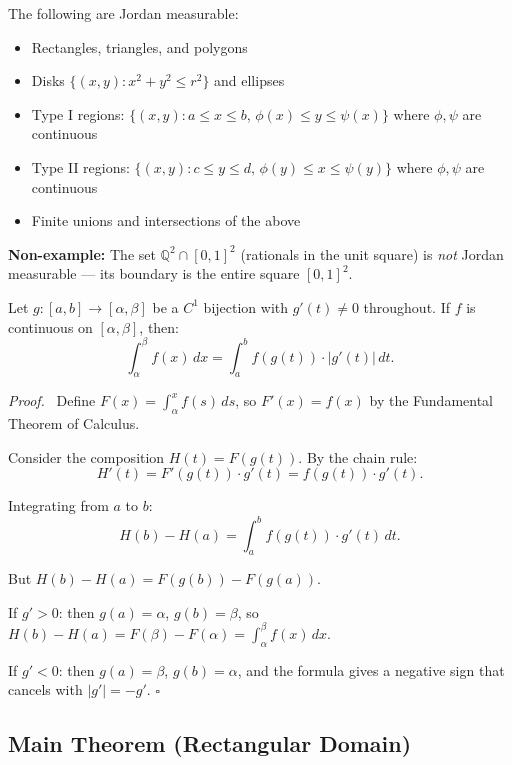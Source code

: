 \documentclass[11pt]{report}
\renewenvironment{proof}[1][Proof]{\par\noindent\textit{#1.}\ }{\hfill$\square$\par\medskip}
\begin{document}
\begin{example}
The following are Jordan measurable:
\begin{itemize}
    \item Rectangles, triangles, and polygons
    \item Disks $\{(x,y): x^2 + y^2 \leq r^2\}$ and ellipses
    \item Type I regions: $\{(x,y): a \leq x \leq b, \, \phi(x) \leq y \leq \psi(x)\}$ where $\phi, \psi$ are continuous
    \item Type II regions: $\{(x,y): c \leq y \leq d, \, \phi(y) \leq x \leq \psi(y)\}$ where $\phi, \psi$ are continuous
    \item Finite unions and intersections of the above
\end{itemize}

\textbf{Non-example:} The set $\mathbb{Q}^2 \cap [0,1]^2$ (rationals in the unit square) is \textit{not} Jordan measurable --- its boundary is the entire square $[0,1]^2$.
\end{example}

\begin{lemma}
\label{lem:1d-cov}
Let $g: [a, b] \to [\alpha, \beta]$ be a $C^1$ bijection with $g'(t) \neq 0$ throughout. If $f$ is continuous on $[\alpha, \beta]$, then:
\[
\int_\alpha^\beta f(x) \, dx = \int_a^b f(g(t)) \cdot |g'(t)| \, dt.
\]
\end{lemma}

\begin{proof}
Define $F(x) = \int_\alpha^x f(s) \, ds$, so $F'(x) = f(x)$ by the Fundamental Theorem of Calculus.

Consider the composition $H(t) = F(g(t))$. By the chain rule:
\[
H'(t) = F'(g(t)) \cdot g'(t) = f(g(t)) \cdot g'(t).
\]

Integrating from $a$ to $b$:
\[
H(b) - H(a) = \int_a^b f(g(t)) \cdot g'(t) \, dt.
\]

But $H(b) - H(a) = F(g(b)) - F(g(a))$.

If $g' > 0$: then $g(a) = \alpha$, $g(b) = \beta$, so $H(b) - H(a) = F(\beta) - F(\alpha) = \int_\alpha^\beta f(x) \, dx$.

If $g' < 0$: then $g(a) = \beta$, $g(b) = \alpha$, and the formula gives a negative sign that cancels with $|g'| = -g'$.
\end{proof}

\subsection*{Main Theorem (Rectangular Domain)}
\end{document}
